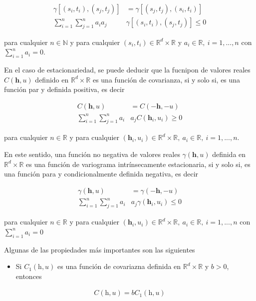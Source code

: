\documentclass[
]{book}
\providecommand{\tightlist}{%
  \setlength{\itemsep}{0pt}\setlength{\parskip}{0pt}}
\begin{document}
\begin{align}
\gamma[(s_i,t_i),(s_j,t_j)]&=\gamma[(s_j,t_j),(s_i,t_i)]\\
\sum_
{i=1}^{n}\sum_
{j=1}^{n}a_ia_j&\gamma[(s_i,t_i),(s_j,t_j)] \leq 0
\end{align}

para cualquier \(n\in \mathbb{N}\) y para cualquier \((s_i,t_i) \in \mathbb{R}^d \times \mathbb{R}\) y \(a_i\in \mathbb{R},\ i=1,...,n\) con \(\sum_{i=1}^na_i=0\).

En el caso de estacionariedad, se puede deducir que la fucnipon de valores reales \(C(\textbf{h},u)\) definido en \(\mathbb{R}^d \times \mathbb{R}\) es una función de covarianza, si y solo si, es una función par y definida positiva, es decir

\begin{align}
C(\textbf{h},u)&=C(-\textbf{h},-u)\\
\sum_
{i=1}^{n}\sum_
{j=1}^{n}a_i&a_jC(\textbf{h}_i,u_i) \geq 0
\end{align}

para cualquier \(n\in \mathbb{R}\) y para cualquier \((\textbf{h}_i,u_i) \in \mathbb{R}^d \times \mathbb{R},\ a_i \in \mathbb{R}, \ i=1,...,n\).

En este sentido, una función no negativa de valores reales \(\gamma(\textbf{h},u)\) definida en \(\mathbb{R}^d \times \mathbb{R}\) es una función de variograma intrínsecamente estacionaria, si y solo si, es una función para y condicionalmente definida negativa, es decir

\begin{align}
\gamma(\textbf{h},u)&=\gamma(-\textbf{h},-u)\\
\sum_
{i=1}^{n}\sum_
{j=1}^{n}a_i&a_j\gamma(\textbf{h}_i,u_i) \leq 0
\end{align}

para cualquier \(n\in \mathbb{R}\) y para cualquier \((\textbf{h}_i,u_i) \in \mathbb{R}^d \times \mathbb{R},\ a_i \in \mathbb{R}, \ i=1,...,n\) con \(\sum_{i=1}^na_i=0\)

Algunas de las propiedades más importantes son las siguientes

\begin{itemize}
\tightlist
\item
  Si \(C_1(\text{h},u)\) es una función de covariazna definida en \(\mathbb{R}^d \times \mathbb{R}\) y \(b>0\), entonces
\end{itemize}

\begin{align}
C(\text{h},u)=bC_1(\text{h},u)
\end{align}
\end{document}
